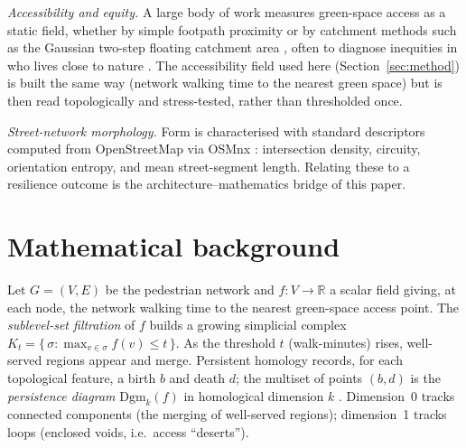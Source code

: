 \emph{Accessibility and equity.} A large body of work measures green-space access
as a static field, whether by simple footpath proximity \citep{carthy2020greenspace}
or by catchment methods such as the Gaussian two-step floating catchment area
\citep{sun2023catchment}, often to diagnose inequities in who lives close to nature
\citep{asibey2026equity}. The accessibility field used here (Section~\ref{sec:method})
is built the same way (network walking time to the nearest green space) but is then
read topologically and stress-tested, rather than thresholded once.

\emph{Street-network morphology.} Form is characterised with standard descriptors
computed from OpenStreetMap via OSMnx \citep{boeing2017osmnx}: intersection
density, circuity, orientation entropy, and mean street-segment length. Relating
these to a resilience outcome is the architecture--mathematics bridge of this
paper.

\section{Mathematical background}
Let $G=(V,E)$ be the pedestrian network and $f:V\to\mathbb{R}$ a scalar field
giving, at each node, the network walking time to the nearest green-space access
point. The \emph{sublevel-set filtration} of $f$ builds a growing simplicial
complex $K_t = \{\,\sigma : \max_{v\in\sigma} f(v)\le t\,\}$. As the threshold
$t$ (walk-minutes) rises, well-served regions appear and merge. Persistent
homology records, for each topological feature, a birth $b$ and death $d$; the
multiset of points $(b,d)$ is the \emph{persistence diagram} $\mathrm{Dgm}_k(f)$
in homological dimension $k$ \citep{edelsbrunner2000persistence}. Dimension~0
tracks connected components (the merging of well-served regions); dimension~1
tracks loops (enclosed voids, i.e.\ access ``deserts'').

